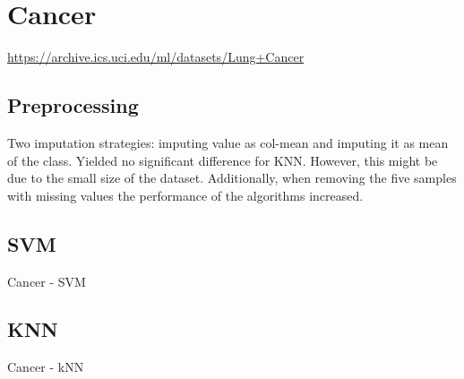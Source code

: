 \section{Cancer}
\url{https://archive.ics.uci.edu/ml/datasets/Lung+Cancer}

\subsection{Preprocessing}
Two imputation strategies: imputing value as col-mean and imputing it as mean of the class. Yielded no significant difference for KNN.
However, this might be due to the small size of the dataset. 
Additionally, when removing the five samples with missing values the performance of the algorithms increased. 

\subsection{SVM}
\begin{table}[tb]
\centering

\caption{Cancer - SVM}
\end{table}

\subsection{KNN}
\begin{table}[tb]
\centering

\caption{Cancer - kNN}
\end{table}
